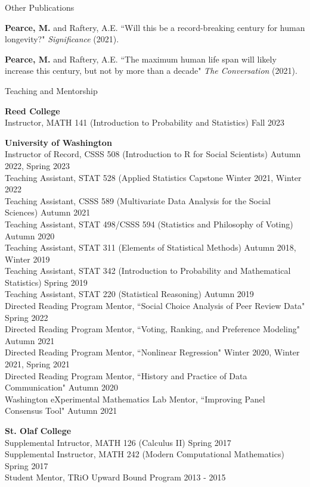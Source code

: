 \documentclass{resume} %
\begin{document}
\begin{rSection}{Other Publications}

{\bf Pearce, M.} and Raftery, A.E. ``Will this be a record-breaking century for human longevity?" {\em Significance} (2021).

{\bf Pearce, M.} and Raftery, A.E. ``The maximum human life span will likely increase this century, but not by more than a decade" {\em The Conversation} (2021).

\end{rSection}

\newpage
\begin{rSection}{Teaching and Mentorship}

{\bf Reed College}
\\ Instructor, MATH 141 (Introduction to Probability and Statistics) \hfill {Fall 2023}

{\bf University of Washington}
\\ Instructor of Record, CSSS 508 (Introduction to R for Social Scientists) \hfill {Autumn 2022, Spring 2023}
\\ Teaching Assistant, STAT 528 (Applied Statistics Capstone \hfill {Winter 2021, Winter 2022}
\\ Teaching Assistant, CSSS 589 (Multivariate Data Analysis for the Social Sciences) \hfill Autumn 2021
\\ Teaching Assistant, STAT 498/CSSS 594 (Statistics and Philosophy of Voting) \hfill Autumn 2020
\\ Teaching Assistant, STAT 311 (Elements of Statistical Methods) \hfill {Autumn 2018, Winter 2019}
\\ Teaching Assistant, STAT 342 (Introduction to Probability and Mathematical Statistics) \hfill {Spring 2019}
\\ Teaching Assistant, STAT 220 (Statistical Reasoning) \hfill {Autumn 2019}
\\ Directed Reading Program Mentor, ``Social Choice Analysis of Peer Review Data" \hfill {Spring 2022}
\\ Directed Reading Program Mentor, ``Voting, Ranking, and Preference Modeling" \hfill {Autumn 2021}
\\ Directed Reading Program Mentor, ``Nonlinear Regression" \hfill {Winter 2020, Winter 2021, Spring 2021}
\\ Directed Reading Program Mentor, ``History and Practice of Data Communication" \hfill {Autumn 2020}
\\ Washington eXperimental Mathematics Lab Mentor, ``Improving Panel Consensus Tool" \hfill {Autumn 2021}

{\bf St. Olaf College}
\\ Supplemental Intructor, MATH 126 (Calculus II) \hfill {Spring 2017}
\\ Supplemental Instructor, MATH 242 (Modern Computational Mathematics) \hfill {Spring 2017}
\\ Student Mentor, TRiO Upward Bound Program \hfill {2013 - 2015}

\end{rSection}
\end{document}

